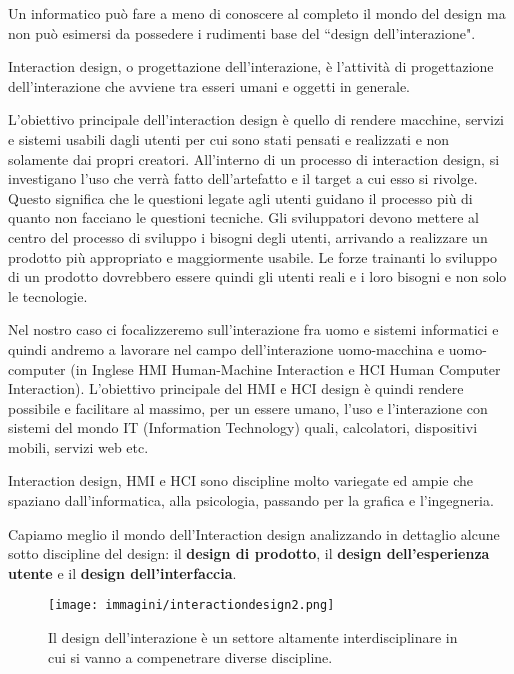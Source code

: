 Un informatico può fare a meno di conoscere al completo il mondo del design ma non può esimersi da possedere i rudimenti base del ``design
dell'interazione".

Interaction design, o progettazione dell'interazione, è l'attività di progettazione dell'interazione che avviene tra esseri umani e oggetti in generale. 


L'obiettivo principale dell'interaction design è quello di rendere macchine, servizi e sistemi usabili dagli utenti per cui sono stati pensati
e realizzati e non solamente dai propri creatori. All'interno di un processo di interaction design, si investigano l'uso che verrà fatto
dell'artefatto e il target a cui esso si rivolge. Questo significa che le questioni legate agli utenti guidano il processo più di quanto non facciano
le questioni tecniche. Gli sviluppatori devono mettere al centro del processo di sviluppo i bisogni degli utenti, arrivando a realizzare un prodotto
più appropriato e maggiormente usabile. Le forze trainanti lo sviluppo di un prodotto dovrebbero essere quindi gli utenti reali e i loro bisogni e
non solo le tecnologie.



Nel nostro caso ci focalizzeremo sull'interazione fra uomo e sistemi informatici e quindi andremo a lavorare nel campo dell'interazione uomo-macchina
e uomo-computer (in Inglese HMI Human-Machine Interaction e HCI Human Computer Interaction). L'obiettivo principale del HMI e HCI design è quindi
rendere possibile e facilitare al massimo, per un essere umano, l'uso e l'interazione con sistemi del mondo IT (Information Technology) quali,
calcolatori, dispositivi mobili, servizi web etc.

Interaction design, HMI e HCI sono discipline molto variegate ed ampie che spaziano dall'informatica, alla psicologia, passando per la grafica e
l'ingegneria. 

Capiamo meglio il mondo dell'Interaction design analizzando in dettaglio alcune sotto discipline del design: il \textbf{design di prodotto},
il \textbf{design dell'esperienza utente} e il \textbf{design dell'interfaccia}. 


\begin{figure}[!ht]
	\centering
	\texttt{[image: immagini/interactiondesign2.png]}
	\caption{Il design dell'interazione è un settore altamente interdisciplinare in cui si vanno a compenetrare diverse discipline.}
\end{figure}

